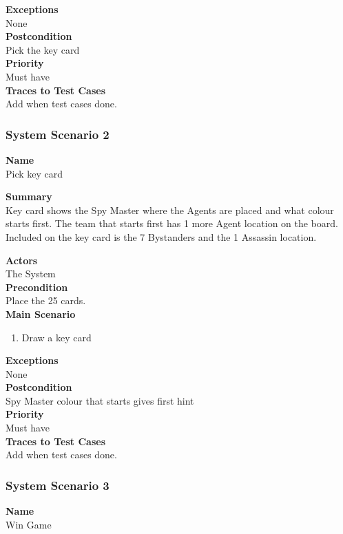 \documentclass[12pt]{article}
\begin{document}
\noindent
{\bf Exceptions}\\
None\\
\noindent
{\bf Postcondition}\\
Pick the key card\\
\noindent
{\bf Priority}\\
Must have\\
\noindent
{\bf Traces to Test Cases}\\
Add when test cases done.
\newpage
\subsubsection{System Scenario 2} \label{ss:2}

\noindent
{\bf Name}\\
Pick key card

\noindent
{\bf Summary}\\
Key card shows the Spy Master where the Agents are placed and what colour starts first. The team that starts first has 1 more Agent location on the board. Included on the key card is the 7 Bystanders and the 1 Assassin location.

\noindent
{\bf Actors}\\
The System\\
\noindent
{\bf Precondition}\\
Place the 25 cards. \\
\noindent
{\bf Main Scenario}\\
\vspace*{-0.2in}
\begin{enumerate}
\item Draw a key card
\end{enumerate}

\noindent
{\bf Exceptions}\\
None\\
\noindent
{\bf Postcondition}\\
Spy Master colour that starts gives first hint\\
\noindent
{\bf Priority}\\
Must have\\
\noindent
{\bf Traces to Test Cases}\\
Add when test cases done.
\newpage
\subsubsection{System Scenario 3} \label{ss:3}

\noindent
{\bf Name}\\
Win Game
\end{document}
